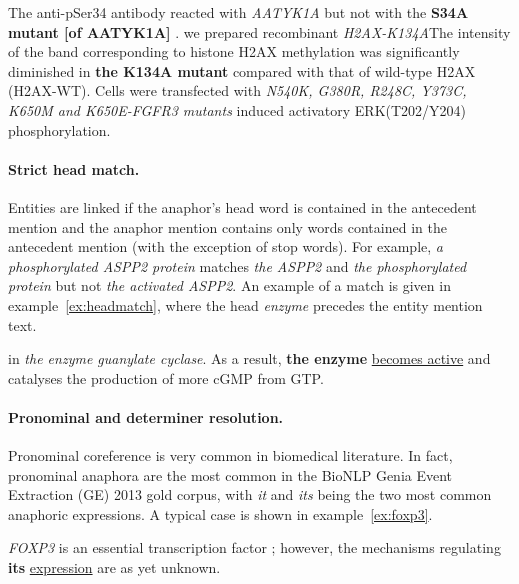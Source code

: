 \begin{exe}
	\ex\label{ex:mut-genericNP} The anti-pSer34 antibody reacted with {\it AATYK1A} but not with the {\bf S34A mutant [of AATYK1A]} \textellipsis .
	\ex\label{ex:mut-mutation} \textellipsis we prepared recombinant {\em H2AX-K134A}\textellipsis The intensity of the band corresponding to histone H2AX methylation was significantly diminished in {\bf the K134A mutant} compared with that of wild-type H2AX (H2AX-WT)\textellipsis .
	\ex\label{ex:mut-protein} Cells were transfected with {\it N540K, G380R, R248C, Y373C, K650M and K650E-FGFR3 mutants}  induced activatory ERK(T202/Y204) phosphorylation\textellipsis .
\end{exe}

\paragraph{Strict head match.}

Entities are linked if the anaphor's head word is contained in the antecedent mention and 
the anaphor mention contains only words contained in the antecedent mention (with the exception of stop words). For 
example, {\it a phosphorylated ASPP2 protein} matches {\it the ASPP2} and {\it the phosphorylated protein} but not {\it 
the activated ASPP2}. An example of a match is given in example~\ref{ex:headmatch}, where the head {\it enzyme} precedes the entity mention text.

\begin{exe}
	\ex\label{ex:headmatch} \textellipsis in {\it the enzyme guanylate cyclase}. As a result, {\bf the enzyme} \underline{becomes active} and catalyses the production of more cGMP from GTP.
\end{exe}

\paragraph{Pronominal and determiner resolution.}

Pronominal coreference is very common in biomedical literature. In fact, pronominal anaphora are the most common in the BioNLP Genia Event Extraction (GE) 2013 gold corpus, with {\it it} and {\it its} being the two most common anaphoric expressions. A typical case is shown in example~\ref{ex:foxp3}.

\begin{exe}
	\ex\label{ex:foxp3} {\it FOXP3} is an essential transcription factor \textellipsis; however, the mechanisms 
regulating {\bf its} \underline{expression} are as yet unknown.
\end{exe}

